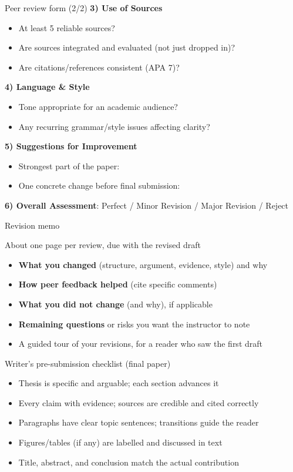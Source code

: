 \documentclass[aspectratio=169]{beamer}
\begin{document}
\begin{frame}{Peer review form (2/2)}
\small
\textbf{3) Use of Sources}
\begin{itemize}
  \item At least 5 reliable sources?
  \item Are sources integrated and evaluated (not just dropped in)?
  \item Are citations/references consistent (APA 7)?
\end{itemize}
\medskip
\textbf{4) Language \& Style}
\begin{itemize}
  \item Tone appropriate for an academic audience?
  \item Any recurring grammar/style issues affecting clarity?
\end{itemize}
\medskip
\textbf{5) Suggestions for Improvement}
\begin{itemize}
  \item Strongest part of the paper:
  \item One concrete change before final submission:
\end{itemize}
\medskip
\textbf{6) Overall Assessment}: Perfect / Minor Revision / Major Revision / Reject
\end{frame}

\begin{frame}{Revision memo}

  About one page per review, due with the revised draft

\begin{itemize}
  \item \textbf{What you changed} (structure, argument, evidence, style) and why
  \item \textbf{How peer feedback helped} (cite specific comments)
  \item \textbf{What you did not change} (and why), if applicable
  \item \textbf{Remaining questions} or risks you want the instructor to note
  \item A guided tour of your revisions, for a reader who saw the first draft
\end{itemize}
\end{frame}

\begin{frame}{Writer's pre-submission checklist (final paper)}
\begin{itemize}
  \item Thesis is specific and arguable; each section advances it
  \item Every claim with evidence; sources are credible and cited correctly
  \item Paragraphs have clear topic sentences; transitions guide the reader
  \item Figures/tables (if any) are labelled and discussed in text
  \item Title, abstract, and conclusion match the actual contribution
\end{itemize}
\end{frame}
\end{document}
